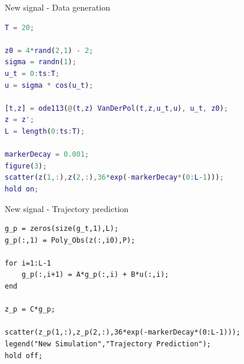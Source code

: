 \documentclass{beamer}
\begin{document}
\begin{frame}[fragile]{New signal - Data generation}
    \begin{lstlisting}[language=matlab]
T = 20;

z0 = 4*rand(2,1) - 2;
sigma = randn(1);
u_t = 0:ts:T;
u = sigma * cos(u_t);

[t,z] = ode113(@(t,z) VanDerPol(t,z,u_t,u), u_t, z0);
z = z';
L = length(0:ts:T);

markerDecay = 0.001;
figure(3);
scatter(z(1,:),z(2,:),36*exp(-markerDecay*(0:L-1)));
hold on;
    \end{lstlisting}
\end{frame}

\begin{frame}[fragile]{New signal - Trajectory prediction}
    \begin{lstlisting}
g_p = zeros(size(g_t,1),L);
g_p(:,1) = Poly_Obs(z(:,i0),P);

for i=1:L-1
    g_p(:,i+1) = A*g_p(:,i) + B*u(:,i);
end

z_p = C*g_p;

scatter(z_p(1,:),z_p(2,:),36*exp(-markerDecay*(0:L-1)));
legend("New Simulation","Trajectory Prediction");
hold off;
    \end{lstlisting}
\end{frame}
\end{document}
